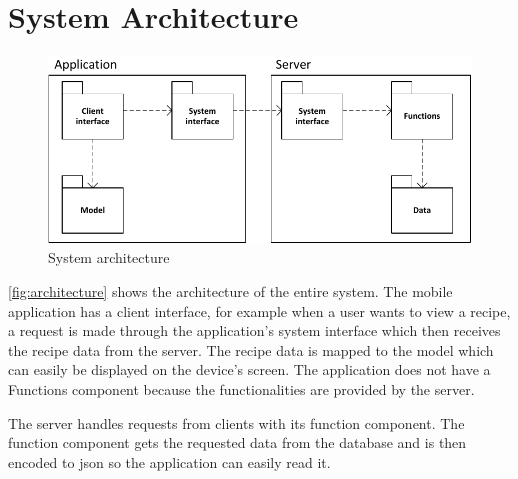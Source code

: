 \section{System Architecture}

\begin{figure}[H]
\centering
\includegraphics[width=0.9\linewidth]{img/components.pdf}
\caption{System architecture}
\label{fig:architecture}
\end{figure}

\autoref{fig:architecture} shows the architecture of the entire system. The mobile application has a client interface, for example when a user wants to view a recipe, a request is made through the application's system interface which then receives the recipe data from the server. The recipe data is mapped to the model which can easily be displayed on the device's screen. The application does not have a Functions component because the functionalities are provided by the server.

The server handles requests from clients with its function component. The function component gets the requested data from the database and is then encoded to \ac{json} so the application can easily read it.